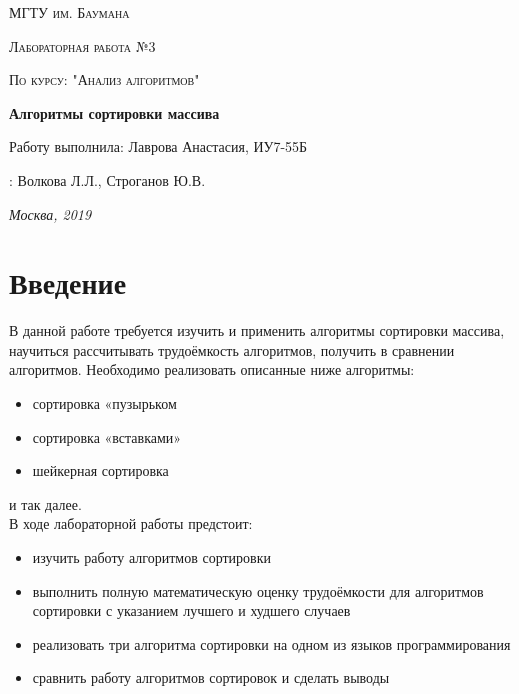 \documentclass[12pt]{report}
\begin{document}
\begin{titlepage}
	\centering
	{\scshape\LARGE МГТУ им. Баумана \par}
	\vspace{3cm}
	{\scshape\Large Лабораторная работа №3\par}
	\vspace{0.5cm}	
	{\scshape\Large По курсу: "Анализ алгоритмов"\par}
	\vspace{1.5cm}
	{\huge\bfseries Алгоритмы сортировки массива\par}
	\vspace{2cm}
	\Large Работу выполнила: Лаврова Анастасия, ИУ7-55Б\par
	\vspace{0.5cm}
	:  Волкова Л.Л., Строганов Ю.В.\par

	\vfill
	\large \textit {Москва, 2019} \par
\end{titlepage}

\tableofcontents

\newpage
\chapter*{Введение}
В данной работе требуется изучить и применить алгоритмы сортировки массива, научиться рассчитывать трудоёмкость алгоритмов, получить в сравнении алгоритмов.
Необходимо реализовать описанные ниже алгоритмы: 
\begin{itemize}
	\item сортировка «пузырьком
	\item сортировка «вставками»
	\item шейкерная сортировка
\end{itemize}
и так далее.\\

В ходе лабораторной работы предстоит:
\begin{itemize}
	\item изучить работу алгоритмов сортировки 
	\item выполнить полную математическую оценку трудоёмкости для алгоритмов сортировки с указанием лучшего и худшего случаев 
	\item  реализовать три алгоритма сортировки на одном из языков программирования 
	\item  сравнить работу алгоритмов сортировок и сделать выводы   
\end{itemize}
\end{document}

